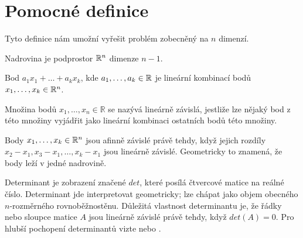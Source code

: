 \section{Pomocné definice}
\label{sec:pomocne-definice}
Tyto definice nám umožní vyřešit problém zobecněný na $n$ dimenzí.

\begin{definition}[Nadrovina]
  \label{definice:nadrovina}
  Nadrovina je podprostor $\mathbb{R}^n$ dimenze $n-1$.
\end{definition}

\begin{definition}
  \label{definice:linearni-kombinace}
  Bod $a_1x_1+\dots+a_kx_k$, kde $a_1, \dots, a_k \in \mathbb{R}$ je lineární kombinací bodů $x_1, \dots, x_k \in \mathbb{R}^n$. \autocite[67]{jindrichbecvarLinearniAlgebra2005}
\end{definition}

\begin{definition}
  \label{definice:linearni-zavislost}
  Množina bodů $x_1, \dots, x_n \in \mathbb{R}$ se nazývá lineárně závislá, jestliže lze nějaký bod z této množiny vyjádřit jako lineární kombinaci ostatních bodů této množiny. \autocite[78]{jindrichbecvarLinearniAlgebra2005}
\end{definition}

\begin{definition}
  \label{definice:afinni-zavislost}
  Body $x_1, \ldots, x_k \in \mathbb{R}^n$ jsou afinně závislé právě tehdy, když jejich rozdíly $x_2-x_1, x_3-x_1, \dots, x_k-x_1$ jsou lineárně závislé. Geometricky to znamená, že body leží v jedné nadrovině. \autocite[4]{matousekConvexity2003}
\end{definition}

\begin{definition}
  \label{definice:determinant}
  Determinant je zobrazení značené $det$, které posílá čtvercové matice na reálné číslo. Determinant jde interpretovat geometricky; lze chápat jako objem obecného $n$-rozměrného rovnoběžnostěnu. Důležitá vlastnost determinantu je, že řádky nebo sloupce matice $A$ jsou lineárně závislé právě tehdy, když $det(A)=0$. \autocites[224]{danmargalitInteractiveLinearAlgebra2019}[4]{matousekConvexity2003}
  Pro hlubší pochopení determinantů vizte \autocite[164]{jindrichbecvarLinearniAlgebra2005} nebo \autocite[187]{danmargalitInteractiveLinearAlgebra2019}.
\end{definition}

